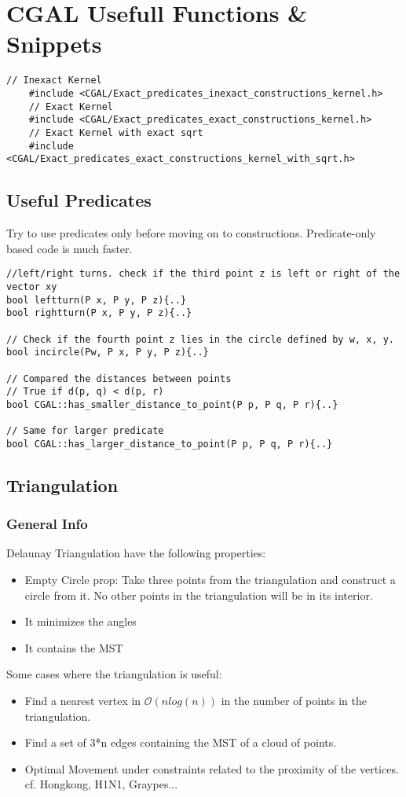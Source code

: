 \documentclass{article}
\begin{document}

\section{CGAL Usefull Functions \& Snippets}
    \begin{lstlisting}[frame=single]
    // Inexact Kernel
    #include <CGAL/Exact_predicates_inexact_constructions_kernel.h>
    // Exact Kernel
    #include <CGAL/Exact_predicates_exact_constructions_kernel.h>
    // Exact Kernel with exact sqrt
    #include <CGAL/Exact_predicates_exact_constructions_kernel_with_sqrt.h>
    \end{lstlisting}

\subsection{Useful Predicates}
Try to use predicates only before moving on to constructions. Predicate-only based code is much faster.
\begin{lstlisting}[frame=single]
//left/right turns. check if the third point z is left or right of the vector xy
bool leftturn(P x, P y, P z){..}
bool rightturn(P x, P y, P z){..}

// Check if the fourth point z lies in the circle defined by w, x, y.
bool incircle(Pw, P x, P y, P z){..}

// Compared the distances between points
// True if d(p, q) < d(p, r)
bool CGAL::has_smaller_distance_to_point(P p, P q, P r){..}

// Same for larger predicate
bool CGAL::has_larger_distance_to_point(P p, P q, P r){..}
\end{lstlisting}
    
\subsection{Triangulation}
\subsubsection{General Info}
Delaunay Triangulation have the following properties:
\begin{itemize}
    \item Empty Circle prop: Take three points from the triangulation and construct a circle from it. No other points in the triangulation will be in its interior.
    \item It minimizes the angles
    \item It contains the MST
\end{itemize}
Some cases where the triangulation is useful:
\begin{itemize}
    \item Find a nearest vertex in $\mathcal{O}(nlog(n))$ in the number of points in the triangulation.
    \item Find a set of 3*n edges containing the MST of a cloud of points.
    \item Optimal Movement under constraints related to the proximity of the vertices. cf. Hongkong, H1N1, Graypes...
\end{itemize}
\end{document}

